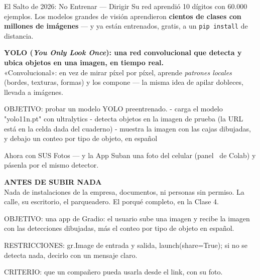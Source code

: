 \documentclass[aspectratio=169, 11pt]{beamer}
\begin{document}
\begin{frame}[shrink=5]{El Salto de 2026: No Entrenar --- Dirigir}
  \vspace{2pt}
  {\scriptsize\color{textMuted}
   Su red aprendió 10 dígitos con 60.000 ejemplos. Los modelos grandes de
   visión aprendieron \textbf{cientos de clases con millones de imágenes} ---
   y ya están entrenados, gratis, a un \texttt{pip install} de distancia.}
  \vspace{2pt}
  \begin{tcolorbox}[colback=arcaGray, colframe=arcaDark, boxrule=0pt,
    leftrule=4pt, arc=3pt, left=10pt, right=10pt, top=4pt, bottom=4pt]
    {\scriptsize\color{arcaDark}\bfseries
     YOLO (\emph{You Only Look Once}): una red convolucional que detecta y
     ubica objetos en una imagen, en tiempo real.}\\[2pt]
    {\scriptsize\color{textMuted}
     «Convolucional»: en vez de mirar píxel por píxel, aprende
     \emph{patrones locales} (bordes, texturas, formas) y los compone ---
     la misma idea de apilar dobleces, llevada a imágenes.}
  \end{tcolorbox}
  \vspace{2pt}
  \begin{prompt}
OBJETIVO: probar un modelo YOLO preentrenado.
- carga el modelo "yolo11n.pt" con ultralytics
- detecta objetos en la imagen de prueba (la URL
  está en la celda dada del cuaderno)
- muestra la imagen con las cajas dibujadas, y debajo
  un conteo por tipo de objeto, en español
  \end{prompt}
\end{frame}

\begin{frame}[shrink=5]{Ahora con SUS Fotos --- y la App}
  \vspace{2pt}
  {\scriptsize\color{textMuted}
   Suban una foto del celular (panel \faFolder\ de Colab) y pásenla por el
   mismo detector.}
  \vspace{2pt}
  \begin{tcolorbox}[colback=arcaGray, colframe=arcaRed, boxrule=0pt,
    leftrule=3pt, arc=3pt, left=8pt, right=8pt, top=4pt, bottom=4pt]
    {\scriptsize\color{arcaRed}\bfseries ANTES DE SUBIR NADA}\\[2pt]
    {\scriptsize\color{textMuted}
     Nada de instalaciones de la empresa, documentos, ni personas sin
     permiso. La calle, su escritorio, el parqueadero. El porqué completo,
     en la Clase 4.}
  \end{tcolorbox}
  \vspace{2pt}
  \begin{prompt}
OBJETIVO: una app de Gradio: el usuario sube una
imagen y recibe la imagen con las detecciones
dibujadas, más el conteo por tipo de objeto en
español.

RESTRICCIONES: gr.Image de entrada y salida,
launch(share=True); si no se detecta nada, decirlo
con un mensaje claro.

CRITERIO: que un compañero pueda usarla desde el
link, con su foto.
  \end{prompt}
\end{frame}
\end{document}
